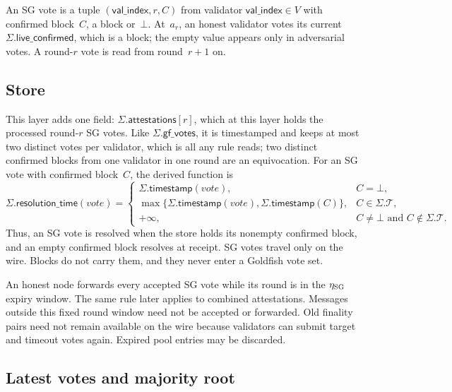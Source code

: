 \documentclass{article}
\theoremstyle{plain}
\theoremstyle{definition}
\theoremstyle{remark}
\newcommand{\valindex}{\mathsf{val\_index}}
\newcommand{\T}{\mathcal T}
\newcommand{\gfPool}{\mathsf{gf\_votes}}
\newcommand{\attestations}{\mathsf{attestations}}
\newcommand{\liveConfirmed}{\mathsf{live\_confirmed}}
\newcommand{\timestamp}{\mathsf{timestamp}}
\newcommand{\resolutionTime}{\mathsf{resolution\_time}}
\begin{document}
An SG vote is a tuple $(\valindex,r,C)$ from validator $\valindex\in V$ with confirmed
block~$C$, a block or~$\bot$.  At~$a_r$, an honest validator votes its current
$\Sigma.\liveConfirmed$, which is a block; the empty value appears only in
adversarial votes.  A
round-$r$ vote is read from round~$r+1$ on.

\subsection{Store}\label{sec:sg-store}

This layer adds one field: $\Sigma.\attestations[r]$, which at this layer
holds the processed round-$r$ SG votes.  Like $\Sigma.\gfPool$, it is
timestamped and keeps at most two distinct
votes per validator, which is all any rule reads; two distinct confirmed
blocks from one validator in one round are an equivocation.  For an SG vote
with confirmed block~$C$, the derived function is
\[
 \Sigma.\resolutionTime(\mathit{vote})=
 \begin{cases}
  \Sigma.\timestamp(\mathit{vote}), & C=\bot,\\
  \max\{\Sigma.\timestamp(\mathit{vote}),\Sigma.\timestamp(C)\},
    & C\in\Sigma.\T,\\
  +\infty, & C\neq\bot\text{ and }C\notin\Sigma.\T.
 \end{cases}
\]
Thus, an SG vote is resolved when the store holds its nonempty confirmed
block, and an empty confirmed block resolves at receipt.  SG votes travel only on the
wire.  Blocks do not carry them, and they never enter a Goldfish vote set.

An honest node forwards every accepted SG vote while its round is in the
$\eta_{\rm SG}$ expiry window.  The same rule later applies to combined
attestations.  Messages outside this fixed round window need not be
accepted or forwarded.  Old finality pairs need not remain available on
the wire because validators can submit target and timeout votes again.
Expired pool entries may be discarded.

\subsection{Latest votes and majority root}\label{sec:sg-fork-choice}
\end{document}
